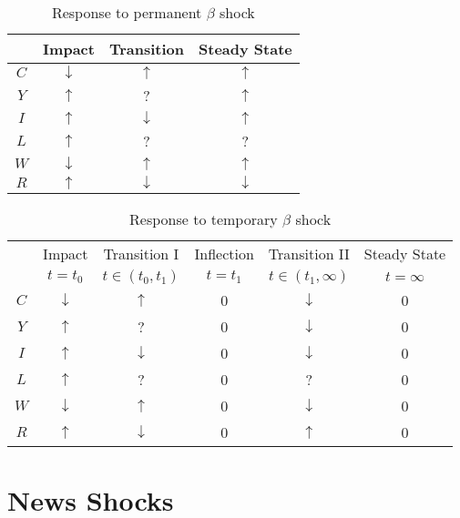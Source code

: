 \documentclass[11pt]{amsart}
\begin{document}
\begin{table}[htp]
\caption{Response to permanent $\beta$ shock}
\begin{center}
\begin{tabular}{c|c|c|c|}
& Impact & Transition & Steady State \\ \hline
$C$ & $\downarrow$ & $\uparrow$ & $\uparrow$ \\
$Y$ & $\uparrow$ & ? & $\uparrow$ \\
$I$ & $\uparrow$ & $\downarrow$ & $\uparrow$ \\
$L$ & $\uparrow$ & ? & ? \\
$W$ & $\downarrow$ & $\uparrow$ & $\uparrow$ \\
$R$ & $\uparrow$ & $\downarrow$ & $\downarrow$ \\
\end{tabular}
\end{center}
\label{default}
\end{table}

\begin{table}[htp]
\caption{Response to temporary $\beta$ shock}
\begin{center}
\begin{tabular}{c|c|c|c|c|c}
			& Impact  & Transition I          & Inflection & Transition II & Steady State  \\
		& $t=t_0$ & $t \in (t_0, t_1)$ & $t = t_1$ & $t \in (t_1, \infty)$ & $t = \infty$ \\
		\hline 
		$C$          & $\downarrow$ &   $\uparrow$      &   0      & $\downarrow$ &    0\\
		$Y$          &    $\uparrow$   &    ?    &    0    &  $\downarrow$  &      0\\
		$I$           &   $\uparrow$    &  $\downarrow$  & 0 & $\downarrow$  &    0\\
		$L$          &   $\uparrow$    &   ?      & 0     &  ? &      0\\
		$W$         & $\downarrow$ &    $\uparrow$     &    0     & $\downarrow$ &  0   \\
		$R$          &  $\uparrow$    &     $\downarrow$     &    0     & $\uparrow$  &  0 \\
		\hline
\end{tabular}
\end{center}
\label{default}
\end{table}

\section{News Shocks}
\end{document}
